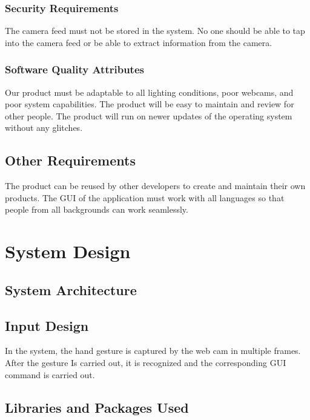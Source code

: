 \documentclass[11pt]{report}
\begin{document}
\subsection{Security Requirements}
The camera feed must not be stored in the system. No one should be able to tap into the camera feed or be able to extract information from the camera.

\subsection{Software Quality Attributes}

Our product must be adaptable to all lighting conditions, poor webcams, and poor system capabilities. The product will be easy to maintain and review for other people. The  product will run on newer updates of the operating system without any glitches.

\section{Other Requirements}
The product can be reused by other developers to create and maintain their own products. The GUI of the application must work with all languages so that people from all backgrounds can work seamlessly. 




\chapter{System Design}
\section{System Architecture}
\section{Input Design}
    In the system, the hand gesture is captured by the web cam in multiple frames. After the gesture Is
    carried out, it is recognized and the corresponding GUI command is carried out.

\section{Libraries and Packages Used}
\end{document}
